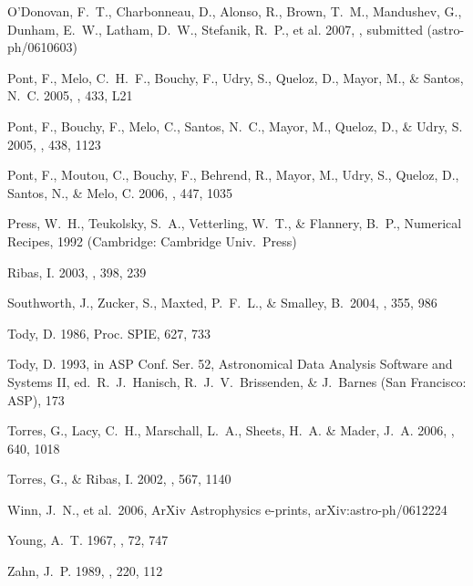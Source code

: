 \documentclass[12pt, preprint]{aastex}
\begin{document}
\begin{thebibliography}{}
O'Donovan, F.\ T., Charbonneau, D., Alonso, R., Brown, T.\ M.,
Mandushev, G., Dunham, E.\ W., Latham, D.\ W., Stefanik, R.\ P., et
al.
2007, \apj, submitted (astro-ph/0610603)

Pont, F., Melo, C.\ H.\ F., Bouchy, F., Udry, S., Queloz, D., Mayor,
M., \& Santos, N.\ C.
2005, \aap, 433, L21

Pont, F., Bouchy, F., Melo, C., Santos, N.\ C., Mayor, M., Queloz, D.,
\& Udry, S.
2005, \aap, 438, 1123

Pont, F., Moutou, C., Bouchy, F., Behrend, R., Mayor, M., Udry, S.,
Queloz, D., Santos, N., \& Melo, C.
2006, \aap, 447, 1035

Press, W.\ H., Teukolsky, S.\ A., Vetterling, W.\ T., \& Flannery, B.\ P.,
Numerical Recipes, 1992 (Cambridge: Cambridge Univ.\ Press)

Ribas, I. 
2003, \aap, 398, 239  

 Southworth, J., 
Zucker, S., Maxted, P.~F.~L., \& Smalley, B.\ 2004, \mnras, 355, 986 

Tody, D. 
1986, Proc. SPIE, 627, 733

Tody, D.
1993, in ASP Conf. Ser. 52, Astronomical Data Analysis Software and
Systems II, ed.\ R.\ J.\ Hanisch, R.\ J.\ V.\ Brissenden, \& J.\
Barnes (San Francisco: ASP), 173

Torres, G., Lacy, C.\ H., Marschall, L.\ A., Sheets, H.\ A. \& Mader,
J.\ A.
2006, \apj, 640, 1018 

Torres, G., \& Ribas, I.
2002, \apj, 567, 1140 

 Winn, J.~N., et al.\ 2006, 
ArXiv Astrophysics e-prints, arXiv:astro-ph/0612224

Young, A.\ T.
1967, \aj, 72, 747 

Zahn, J.\ P.
1989, \aap, 220, 112

\end{thebibliography}
\end{document}
